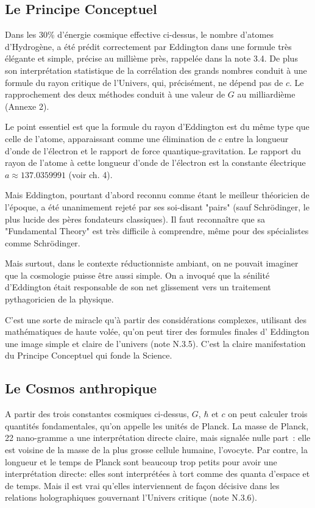 \documentclass[a4paper,12pt]{article}
\begin{document}
\subsection{Le Principe Conceptuel}
 

Dans les 30\% d'énergie cosmique effective ci-dessus, le nombre d'atomes d'Hydrogène, a été prédit correctement par Eddington dans une formule très élégante et simple, précise au millième près, rappelée dans la note 3.4. De plus son interprétation statistique de la corrélation des grands nombres conduit à une formule du rayon critique de l'Univers, qui, précisément, ne dépend pas de $c$. Le rapprochement des deux méthodes conduit à une valeur de $G$ au milliardième (Annexe 2).

Le point essentiel est que la formule du rayon d'Eddington est du même type que celle de l'atome, apparaissant comme une élimination de $c$ entre la longueur d'onde de l'électron et le rapport de force quantique-gravitation. Le rapport du rayon de l'atome à cette longueur d'onde de l'électron est la constante électrique $a \approx 137.0359991$ (voir ch. 4).
  
Mais Eddington, pourtant d'abord reconnu comme étant le meilleur théoricien de l'époque, a été unanimement rejeté par ses soi-disant "pairs" (sauf Schrödinger, le plus lucide des pères fondateurs classiques). Il faut reconnaître que sa "Fundamental Theory" est très difficile à comprendre, même pour des spécialistes comme Schrödinger. 


Mais surtout, dans le contexte réductionniste ambiant, on ne pouvait imaginer que la cosmologie puisse être aussi simple. On a invoqué que la sénilité d'Eddington était responsable de son net glissement vers un traitement pythagoricien de la physique.

C’est une sorte de miracle qu’à partir des considérations complexes, utilisant des mathématiques de haute volée, qu’on peut tirer des formules finales d’ Eddington une image simple et claire de l’univers (note N.3.5). C’est la claire manifestation du Principe Conceptuel qui fonde la Science.



\subsection{Le Cosmos anthropique}

A partir des trois constantes cosmiques ci-dessus, $G$, $\hbar$ et $c$ on peut calculer trois quantités fondamentales, qu'on appelle les unités de Planck. La masse de Planck, 22 nano-gramme a une interprétation directe claire, mais signalée nulle part : elle est voisine de la masse de la plus grosse cellule humaine, l'ovocyte. Par contre, la longueur et le temps de Planck sont beaucoup trop petits pour avoir une interprétation directe: elles sont interprétées à tort comme des quanta d'espace et de temps. Mais il est vrai qu'elles interviennent de façon décisive dans les relations holographiques gouvernant l'Univers critique (note N.3.6). 
\end{document}

